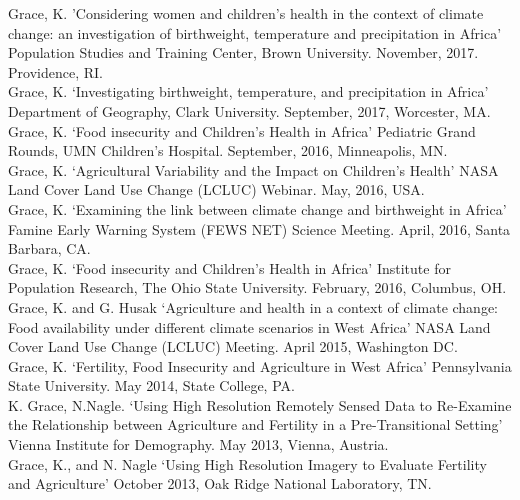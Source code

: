 \documentclass[11pt]{article} %
\begin{document}
\noindent
Grace, K. 'Considering women and children's health in the context of climate change: an investigation of birthweight, temperature and precipitation in Africa' Population Studies and Training Center, Brown University.  November, 2017. \\ Providence, RI.\\

\noindent
Grace, K. `Investigating birthweight, temperature, and precipitation in Africa' Department of Geography, Clark University. September, 2017, Worcester, MA.\\

\noindent
Grace, K. `Food insecurity and Children's Health in Africa' Pediatric Grand Rounds, UMN Children's Hospital. September, 2016, Minneapolis, MN.\\

\noindent
Grace, K. `Agricultural Variability and the Impact on Children's Health' NASA Land Cover Land Use Change (LCLUC) Webinar.  May, 2016, USA.\\

\noindent
Grace, K. `Examining the link between climate change and birthweight in Africa' Famine Early Warning System (FEWS NET) Science Meeting.  April, 2016, Santa Barbara, CA.\\

\noindent
Grace, K. `Food insecurity and Children's Health in Africa' Institute for Population Research, The Ohio State University. February, 2016, Columbus, OH.\\

\noindent
Grace, K. and G. Husak `Agriculture and health in a context of climate change: Food availability under different climate scenarios in West Africa' NASA Land Cover Land Use Change (LCLUC) Meeting. April 2015, Washington DC.\\

\noindent
Grace, K. `Fertility, Food Insecurity and Agriculture in West Africa' Pennsylvania State University. May 2014, State College, PA.\\

\noindent
K. Grace, N.Nagle. `Using High Resolution Remotely Sensed Data to Re-Examine the Relationship between Agriculture and Fertility in a Pre-Transitional Setting'  Vienna Institute for Demography. May 2013, Vienna, Austria.\\

\noindent
Grace, K., and N. Nagle `Using High Resolution Imagery to Evaluate Fertility and Agriculture' October 2013,  Oak Ridge National Laboratory, TN. \\
\end{document}
